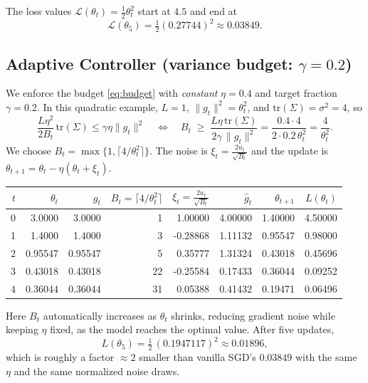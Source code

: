 \documentclass[12pt]{article}
\begin{document}
The loss values $\mathcal{L}(\theta_t)=\tfrac{1}{2}\theta_t^2$ start at $4.5$ and end at
\[
\mathcal{L}(\theta_5)=\tfrac{1}{2} (0.27744)^2 \approx 0.03849.
\]

\subsection{Adaptive Controller (variance budget: $\gamma=0.2$)}

We enforce the budget \eqref{eq:budget} with \emph{constant} $\eta=0.4$ and target fraction $\gamma=0.2$.
In this quadratic example, $L=1$, $\|g_t\|^2=\theta_t^2$, and $\mathrm{tr}(\Sigma)=\sigma^2=4$, so
\[
\frac{L\eta^2}{2B_t}\,\mathrm{tr}(\Sigma) \le \gamma \eta \|g_t\|^2
\quad\Longleftrightarrow\quad
B_t \;\ge\; \frac{L\eta\,\mathrm{tr}(\Sigma)}{2\gamma\,\|g_t\|^2}
= \frac{0.4\cdot 4}{2\cdot 0.2\,\theta_t^2}
= \frac{4}{\theta_t^2}.
\]
We choose $B_t=\max\{1,\lceil 4/\theta_t^2\rceil\}$. The noise is $\xi_t=\frac{2u_t}{\sqrt{B_t}}$ and the update is $\theta_{t+1}=\theta_t-\eta(\theta_t+\xi_t)$.

\begin{center}
\small
\begin{tabular}{@{}rrrrrrrr@{}}
\toprule
$t$ & $\theta_t$ & $g_t$ & $B_t=\lceil 4/\theta_t^2\rceil$ & $\xi_t=\frac{2u_t}{\sqrt{B_t}}$ & $\widehat g_t$ & $\theta_{t+1}$ & $L(\theta_t)$ \\
\midrule
0 & 3.0000 & 3.0000 & \phantom{0}1 & \phantom{-}1.00000 & \phantom{-}4.00000 & 1.40000 & 4.50000 \\
1 & 1.4000 & 1.4000 & \phantom{0}3 & -0.28868 & \phantom{-}1.11132 & 0.95547 & 0.98000 \\
2 & 0.95547 & 0.95547 & \phantom{0}5 & \phantom{-}0.35777 & \phantom{-}1.31324 & 0.43018 & 0.45696 \\
3 & 0.43018 & 0.43018 & 22 & -0.25584 & \phantom{-}0.17433 & 0.36044 & 0.09252 \\
4 & 0.36044 & 0.36044 & 31 & \phantom{-}0.05388 & \phantom{-}0.41432 & 0.19471 & 0.06496 \\
\bottomrule
\end{tabular}
\end{center}

\noindent
Here $B_t$ automatically increases as $\theta_t$ shrinks, reducing gradient noise while keeping $\eta$ fixed, as the model reaches the optimal value. After five updates,
\[
L(\theta_5)=\tfrac{1}{2}\,(0.1947117)^2 \approx 0.01896,
\]
which is roughly a factor $\approx 2$ smaller than vanilla SGD's $0.03849$ with the same $\eta$ and the same normalized noise draws.
\end{document}
